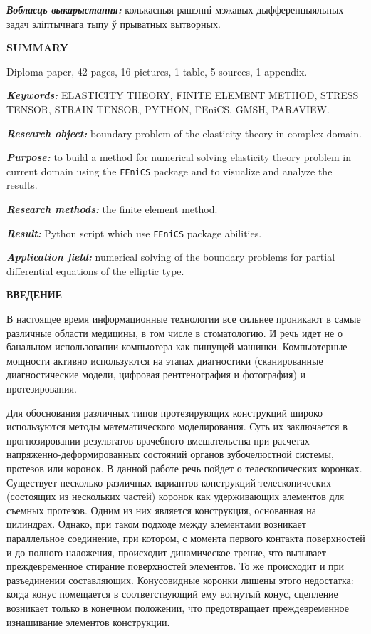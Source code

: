\documentclass[a4paper, 14pt]{extreport}
\begin{document}
\textbf{\textit{Вобласць выкарыстання:}} колькасныя рашэнні мэжавых 
дыфференцыяльных задач эліптычнага тыпу ў прыватных вытворных.


\begin{center}
	\Large{\textbf{SUMMARY}}
\end{center}

Diploma paper, 42 pages, 16 pictures, 1 table,
5 sources, 1 appendix.

\textbf{\textit{Keywords:}} ELASTICITY THEORY, FINITE ELEMENT METHOD,
STRESS TENSOR,  STRAIN TENSOR, PYTHON, FEniCS, GMSH, 
PARAVIEW.

\textbf{\textit{Research object:}} boundary problem of the elasticity
theory in complex domain.

\textbf{\textit{Purpose:}} to build a method for numerical solving 
elasticity theory problem in current domain using the \texttt{FEniCS}
package and to visualize and analyze the results.

\textbf{\textit{Research methods:}} the finite element method.

\textbf{\textit{Result:}} Python script which use \texttt{FEniCS}
package abilities.

\textbf{\textit{Application field:}} numerical solving of the
boundary problems for partial differential equations of the elliptic type.


\newpage
{}
\begin{center}
	\Large{\textbf{ВВЕДЕНИЕ}}
\end{center}

В настоящее время информационные технологии все сильнее 
проникают в самые различные области медицины, в том числе в 
стоматологию. И речь идет не о банальном использовании 
компьютера как пишущей машинки. Компьютерные 
мощности активно используются на этапах диагностики
(сканированные диагностические модели, цифровая рентгенография и фотография) и протезирования.

Для обоснования различных типов протезирующих конструкций 
широко используются методы математического моделирования.
Суть их заключается в прогнозировании результатов врачебного 
вмешательства при расчетах напряженно-деформированных 
состояний органов зубочелюстной системы, протезов или 
коронок. В данной работе речь пойдет о телескопических
коронках.
Существует несколько различных вариантов конструкций
телескопических (состоящих из нескольких частей) коронок 
как удерживающих элементов для съемных протезов.
Одним из них является конструкция, основанная на 
цилиндрах. Однако, при таком подходе между элементами
возникает параллельное соединение, при котором, с момента 
первого контакта поверхностей и до полного наложения, 
происходит динамическое трение, что вызывает 
преждевременное стирание поверхностей элементов. То 
же происходит и при разъединении составляющих.
Конусовидные коронки лишены этого недостатка: когда конус
помещается в соответствующий ему вогнутый конус, сцепление
возникает только в конечном положении, что предотвращает 
преждевременное изнашивание элементов конструкции.
\end{document}
